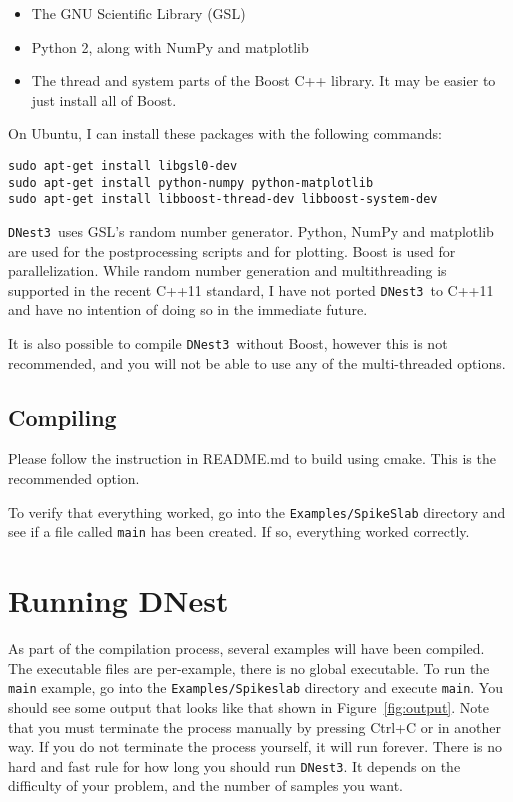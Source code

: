 \documentclass[a4paper, 11pt]{article}
\newcommand{\dnest}{{\tt DNest3}}
\begin{document}
\begin{itemize}
\item The GNU Scientific Library (GSL)
\item Python 2, along with NumPy and matplotlib
\item The thread and system parts of the Boost C++ library.
It may be easier to just install all of Boost.
\end{itemize}

On Ubuntu, I can install these packages with the following commands:
\begin{verbatim}
sudo apt-get install libgsl0-dev
sudo apt-get install python-numpy python-matplotlib
sudo apt-get install libboost-thread-dev libboost-system-dev
\end{verbatim}

\dnest~uses GSL's random number generator. Python, NumPy and
matplotlib are used for the postprocessing scripts and for
plotting. Boost is used for parallelization. While random number generation and
multithreading is supported
in the recent C++11 standard, I have not ported \dnest~to C++11 and have no
intention of doing so in the immediate future.

It is also possible to compile \dnest~without Boost, however this is not
recommended, and you will not be able to use any of the multi-threaded options.

\subsection{Compiling}
Please follow the instruction in README.md to build using cmake. This is the
recommended option.

To
verify that everything worked, go into the {\tt Examples/SpikeSlab} directory
and see if a file called {\tt main} has been created. If so, everything worked
correctly.

\section{Running DNest}
As part of the compilation process, several examples will have been compiled.
The executable files are per-example, there is no global executable.
To run the {\tt main} example, go into the {\tt Examples/Spikeslab}
directory and execute {\tt main}. You should see some output that looks like
that shown in Figure~\ref{fig:output}.
Note that you must terminate the process manually by pressing Ctrl+C
or in another way. If you do not terminate the process yourself, it will run
forever. There is no hard and fast rule for how long you should run \dnest.
It depends on the difficulty of your problem, and the number of samples you
want.
\end{document}
